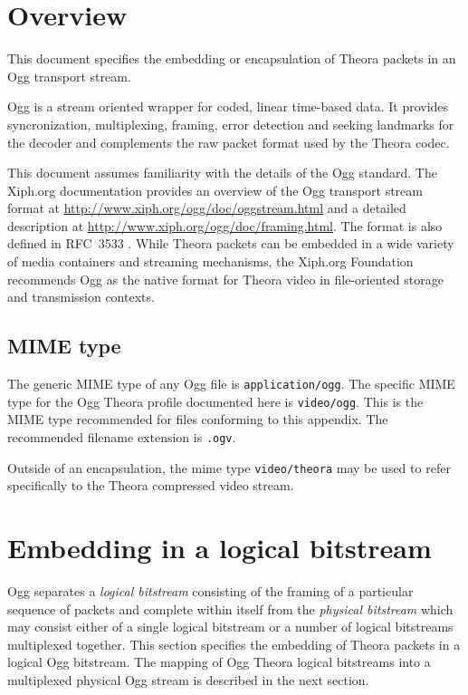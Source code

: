 \documentclass[9pt,letterpaper]{book}
\numberwithin{equation}{chapter}
\numberwithin{figure}{chapter}
\numberwithin{table}{chapter}
\begin{document}
\section{Overview}

This document specifies the embedding or encapsulation of Theora packets
 in an Ogg transport stream.

Ogg is a stream oriented wrapper for coded, linear time-based data.
It provides syncronization, multiplexing, framing, error detection and
 seeking landmarks for the decoder and complements the raw packet format
 used by the Theora codec.

This document assumes familiarity with the details of the Ogg standard.
The Xiph.org documentation provides an overview of the Ogg transport stream
 format at \url{http://www.xiph.org/ogg/doc/oggstream.html} and a detailed
 description at \url{http://www.xiph.org/ogg/doc/framing.html}.
The format is also defined in RFC~3533 \cite{rfc3533}.
While Theora packets can be embedded in a wide variety of media
 containers and streaming mechanisms, the Xiph.org Foundation
 recommends Ogg as the native format for Theora video in file-oriented
 storage and transmission contexts.

\subsection{MIME type}

The generic MIME type of any Ogg file is {\tt application/ogg}.
The specific MIME type for the Ogg Theora profile documented here
is {\tt video/ogg}. This is the MIME type recommended for files
conforming to this appendix. The recommended filename extension
is {\tt .ogv}.

Outside of an encapsulation, the mime type {\tt video/theora} may
 be used to refer specifically to the Theora compressed video stream.

\section{Embedding in a logical bitstream}

Ogg separates a {\em logical bitstream} consisting of the framing of
 a particular sequence of packets and complete within itself from
 the {\em physical bitstream} which may consist either of a single
 logical bitstream or a number of logical bitstreams multiplexed
 together.
This section specifies the embedding of Theora packets in a logical Ogg
 bitstream.
The mapping of Ogg Theora logical bitstreams into a multiplexed physical Ogg
 stream is described in the next section.
\end{document}
